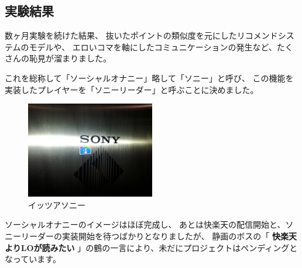 \subsection{実験結果}

数ヶ月実験を続けた結果、
抜いたポイントの類似度を元にしたリコメンドシステムのモデルや、
エロいコマを軸にしたコミュニケーションの発生など、たくさんの恥見が溜まりました。

これを総称して「ソーシャルオナニー」略して「ソニー」と呼び、
この機能を実装したプレイヤーを「ソニーリーダー」と呼ぶことに決めました。

\begin{figure}[H]
  \centering
  \includegraphics[width=0.5\textwidth]{../images/sony_reader.jpg}
  \caption{イッツアソニー}
\end{figure}

ソーシャルオナニーのイメージはほぼ完成し、
あとは快楽天の配信開始と、ソニーリーダーの実装開始を待つばかりとなりましたが、
静画のボスの「 \textbf{快楽天よりLOが読みたい}
」の鶴の一言により、未だにプロジェクトはペンディングとなっています。
